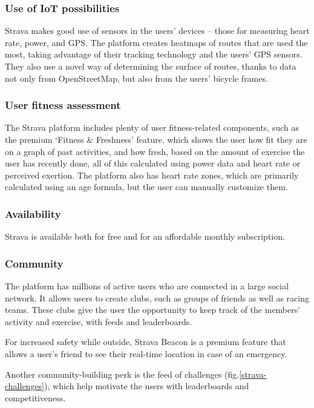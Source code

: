 \subsubsection*{Use of IoT possibilities}
Strava makes good use of sensors in the users' devices -- those for measuring heart rate, power, and GPS.
The platform creates heatmaps of routes that are used the most, taking advantage of their tracking technology and the users' GPS sensors.
They also use a novel way of determining the surface of routes, thanks to data not only from OpenStreetMap, but also from the users' bicycle frames.

\subsubsection*{User fitness assessment}
The Strava platform includes plenty of user fitness-related components, such as the premium `Fitness \& Freshness' feature,
which shows the user how fit they are on a graph of past activities, and how fresh, based on the amount of exercise the user has recently done,
all of this calculated using power data and heart rate or perceived exertion. \cite{strava-fitness-freshness}
The platform also has heart rate zones, which are primarily calculated using an age formula, but the user can manually customize them.
\subsubsection*{Availability}
Strava is available both for free and for an affordable monthly subscription.
\subsubsection*{Community}
The platform has millions of active users who are connected in a large social network.
It allows users to create clubs, such as groups of friends as well as racing teams.
These clubs give the user the opportunity to keep track of the members' activity and exercise, with feeds and leaderboards.

For increased safety while outside, Strava Beacon is a premium feature that allows a user's friend to see their real-time location in case of an emergency.

Another community-building perk is the feed of challenges (fig.\ref{strava-challenges}), which help motivate the users with leaderboards and competitiveness.

